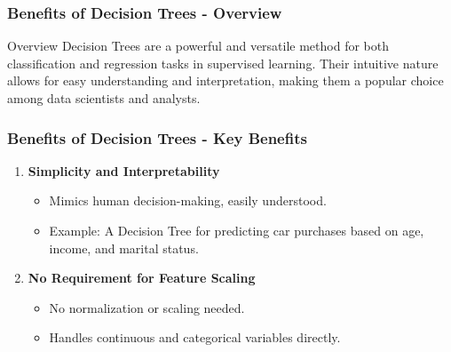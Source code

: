 \documentclass[aspectratio=169]{beamer}
\begin{document}
\begin{frame}[fragile]
  \frametitle{Benefits of Decision Trees - Overview}
  \begin{block}{Overview}
    Decision Trees are a powerful and versatile method for both classification and regression tasks in supervised learning. 
    Their intuitive nature allows for easy understanding and interpretation, making them a popular choice among data scientists and analysts.
  \end{block}
\end{frame}

\begin{frame}[fragile]
  \frametitle{Benefits of Decision Trees - Key Benefits}
  \begin{enumerate}
    \item \textbf{Simplicity and Interpretability}
      \begin{itemize}
        \item Mimics human decision-making, easily understood.
        \item Example: A Decision Tree for predicting car purchases based on age, income, and marital status.
      \end{itemize}
      
    \item \textbf{No Requirement for Feature Scaling}
      \begin{itemize}
        \item No normalization or scaling needed.
        \item Handles continuous and categorical variables directly.
      \end{itemize}
  \end{enumerate}
\end{frame}
\end{document}
